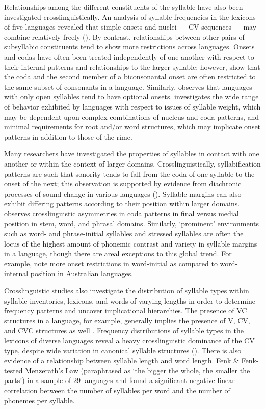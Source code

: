   Relationships among the different constituents of the syllable have also been investigated crosslinguistically. An analysis of syllable frequencies in the lexicons of five languages revealed that simple onsets and nuclei — CV sequences — may combine relatively freely (\citealt{MaddiesonPrecoda1992}). By contrast, relationships between other pairs of subsyllabic constituents tend to show more restrictions across languages. Onsets and codas have often been treated independently of one another with respect to their internal patterns and relationships to the larger syllable; however, \citet{DavisBaertsch2011} show that the coda and the second member of a biconsonantal onset are often restricted to the same subset of consonants in a language. Similarly, \citet{Blevins2006} observes that languages with only open syllables tend to have optional onsets. \citet{Gordon2006} investigates the wide range of behavior exhibited by languages with respect to issues of syllable weight, which may be dependent upon complex combinations of nucleus and coda patterns, and minimal requirements for root and/or word structures, which may implicate onset patterns in addition to those of the rime.

  Many researchers have investigated the properties of syllables in contact with one another or within the context of larger domains. Crosslinguistically, syllabification patterns are such that sonority tends to fall from the coda of one syllable to the onset of the next; this observation is supported by evidence from diachronic processes of sound change in various languages (\citealt{Hooper1976,MurrayVennemann1983}). Syllable margins can also exhibit differing patterns according to their position within larger domains. \citet{Côté2011} observes crosslinguistic asymmetries in coda patterns in final versus medial position in stem, word, and phrasal domains. Similarly, ‘prominent’ environments such as word- and phrase-initial syllables and stressed syllables are often the locus of the highest amount of phonemic contrast and variety in syllable margins in a language, though there are areal exceptions to this global trend. For example, \citet{GasserBowern2014} note more onset restrictions in word-initial as compared to word-internal position in Australian languages.

  Crosslinguistic studies also investigate the distribution of syllable types within syllable inventories, lexicons, and words of varying lengths in order to determine frequency patterns and uncover implicational hierarchies. The presence of VC structures in a language, for example, generally implies the presence of V, CV, and CVC structures as well \citep{Blevins1995}. Frequency distributions of syllable types in the lexicons of diverse languages reveal a heavy crosslinguistic dominance of the CV type, despite wide variation in canonical syllable structures (\citealt{Rousset2004,ValléeEtAl2009}). There is also evidence of a relationship between syllable length and word length. Fenk \& Fenk-\citet{Oczlon1993} tested Menzerath’s Law (paraphrased as ‘the bigger the whole, the smaller the parts’) in a sample of 29 languages and found a significant negative linear correlation between the number of syllables per word and the number of phonemes per syllable.

